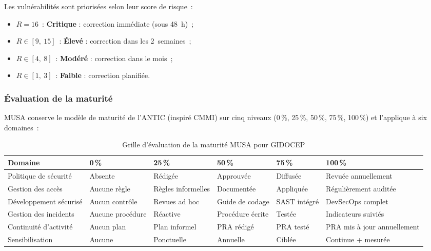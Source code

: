 \documentclass[12pt,a4paper,oneside]{report}
\begin{document}
Les vuln\'erabilit\'es sont prioris\'ees selon leur score de risque~:

\begin{itemize}[label={\color{gold}}, leftmargin=*, itemsep=2pt]
	\item $R = 16$~: \textbf{Critique} : correction imm\'ediate (sous 48~h)~;
	\item $R \in [9,~15]$~: \textbf{\'Elev\'e} : correction dans les 2~semaines~;
	\item $R \in [4,~8]$~: \textbf{Mod\'er\'e} : correction dans le mois~;
	\item $R \in [1,~3]$~: \textbf{Faible} : correction planifi\'ee.
\end{itemize}

\subsubsection{\'Evaluation de la maturit\'e}

MUSA conserve le mod\`ele de maturit\'e de l'ANTIC (inspir\'e CMMI) sur cinq
niveaux (0\,\%, 25\,\%, 50\,\%, 75\,\%, 100\,\%) et l'applique \`a six domaines~:

\begin{table}[H]
	\centering\small
	\caption{Grille d'\'evaluation de la maturit\'e MUSA pour GIDOCEP}
	\label{tab:maturite}
	\begin{tabularx}{\textwidth}{p{4.5cm}p{1.5cm}p{1.5cm}p{1.5cm}p{1.5cm}X}
		\toprule
		\rowcolor{theadcolor}
		\color{white}\textbf{Domaine} &
		\color{white}\textbf{0\,\%} &
		\color{white}\textbf{25\,\%} &
		\color{white}\textbf{50\,\%} &
		\color{white}\textbf{75\,\%} &
		\color{white}\textbf{100\,\%} \\
		\midrule
		Politique de s\'ecurit\'e & Absente & R\'edig\'ee & Approuv\'ee & Diffus\'ee &
		Revu\'ee annuellement \\
		Gestion des acc\`es & Aucune r\`egle & R\`egles informelles & Document\'ee &
		Appliqu\'ee & R\'eguli\`erement audit\'ee \\
		D\'eveloppement s\'ecuris\'e & Aucun contr\^ole & Revues ad hoc &
		Guide de codage & SAST int\'egr\'e & DevSecOps complet \\
		Gestion des incidents & Aucune proc\'edure & R\'eactive & Proc\'edure \'ecrite &
		Test\'ee & Indicateurs suivi\'es \\
		Continuité d'activit\'e & Aucun plan & Plan informel & PRA r\'edig\'e &
		PRA test\'e & PRA mis \`a jour annuellement \\
		Sensibilisation & Aucune & Ponctuelle & Annuelle & Cibl\'ee & Continue + mesur\'ee \\
		\bottomrule
	\end{tabularx}
\end{table}
\end{document}
